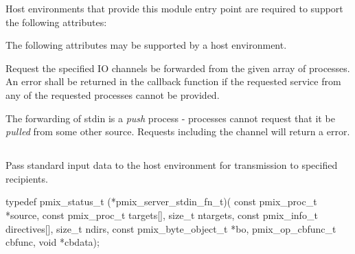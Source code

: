 \divider

Host environments that provide this module entry point are required to support the following attributes:


\reqattrend

\optattrstart
The following attributes may be supported by a host environment.


\optattrend

\descr

Request the specified IO channels be forwarded from the given array of processes. An error shall be returned in the callback function if the requested service from any of the requested processes cannot be provided.

\adviceimplstart
The forwarding of stdin is a \textit{push} process - processes cannot request that it be \textit{pulled} from some other source. Requests including the  channel will return a  error.
\adviceimplend


\subsection{}

\summary

Pass standard input data to the host environment for transmission to specified recipients.

\format

\cspecificstart
\begin{codepar}
typedef pmix_status_t (*pmix_server_stdin_fn_t)(
                           const pmix_proc_t *source,
                           const pmix_proc_t targets[],
                           size_t ntargets,
                           const pmix_info_t directives[],
                           size_t ndirs,
                           const pmix_byte_object_t *bo,
                           pmix_op_cbfunc_t cbfunc, void *cbdata);
\end{codepar}
\cspecificend

\begin{arglist}
\end{arglist}

